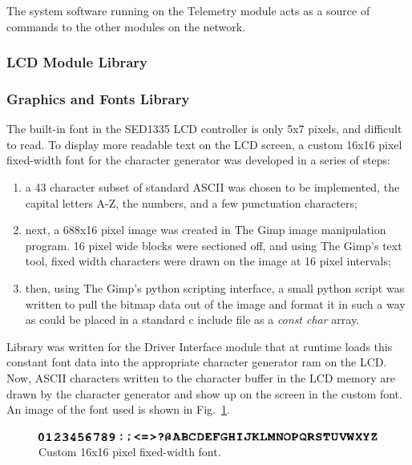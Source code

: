 The system software running on the Telemetry module acts as a source of commands to the other modules on the network.

\subsubsection{LCD Module Library}


\subsubsection{Graphics and Fonts Library}

The built-in font in the SED1335 LCD controller is only 5x7 pixels, and difficult to read. To display more readable text on the LCD screen, a custom 16x16 pixel fixed-width font for the character generator was developed in a series of steps:
\begin{enumerate}
 \item a 43 character subset of standard ASCII was chosen to be implemented, the capital letters A-Z, the numbers, and a few punctuation characters;
 \item next, a 688x16 pixel image was created in The Gimp image manipulation program. 16 pixel wide blocks were sectioned off, and using The Gimp's text tool, fixed width characters were drawn on the image at 16 pixel intervals;
  \item then, using The Gimp's python scripting interface, a small python script was written to pull the bitmap data out of the image and format it in such a way as could be placed in a standard c include file as a \emph{const char} array.
\end{enumerate}

Library was written for the Driver Interface module that at runtime loads this constant font data into the appropriate character generator ram on the LCD. Now, ASCII characters written to the character buffer in the LCD memory are drawn by the character generator and show up on the screen in the custom font. An image of the font used is shown in Fig.\ \ref{fig:driver_interface_font}.

\begin{figure}[htp]
 \centering
 \includegraphics[scale=1]{implementation/figures/driver_interface_font.eps}
 \caption{Custom 16x16 pixel fixed-width font.}
 \label{fig:driver_interface_font}
\end{figure}

